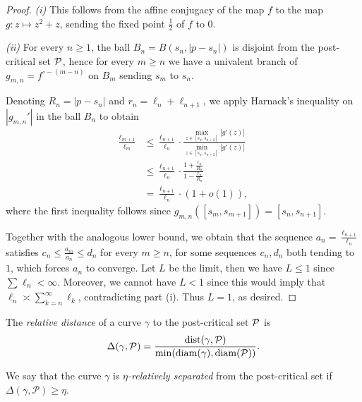\begin{proof} \leavevmode
	\emph{(i)} This follows from the affine conjugacy of the map $f$ to the map $g: z\mapsto z^2+z$, sending the fixed point $\frac 12$ of $f$ to $0$.
	
	\emph{(ii)} For every $n \geq 1$, the ball $B_n = B(s_n, |p - s_n|)$
	is disjoint from the post-critical set $\operatorname{\mathcal P}$, hence for every $m \geq n$ we have a univalent branch of $g_{m,n}=f^{\circ -(m-n)}$ on $B_m$ sending $s_m$ to $s_n$. 
	
	Denoting $R_n= |p-s_n|$ and $r_n = \ell_n+\ell_{n+1}$, we apply Harnack's inequality on $|g_{m,n}'|$ in the ball $B_n$ to obtain 
	\begin{align*}
		\frac{\ell_{m+1}}{\ell_m}  & \leq \frac{\ell_{n+1}}{\ell_n} \cdot \frac{\max_{z\in [s_n,s_{n+2}]} |g'(z)|}{\min_{z \in [s_n,s_{n+2}]} |g'(z)|}  \\ &
		 \leq \frac{\ell_{n+1}}{\ell_n} \cdot \frac{1+\frac{r_n}{R_n}}{1-\frac{r_n}{R_n}}
		 \\ &= \frac{\ell_{n+1}}{\ell_n} \cdot (1+o(1)),
	\end{align*}
	where the first inequality follows since $g_{m,n}\left([s_m,s_{m+1}]\right) = [s_n,s_{n+1}]$.
	
	Together with the analogous lower bound, we obtain that the sequence  $a_n = \frac{\ell_{n+1}}{\ell_n}$ satisfies $c_n \leq \frac {a_m}{a_n} \leq d_n$ for every $m \geq n$, for some sequences $c_n,d_n$ both tending to $1$, which forces $a_n$ to converge. Let $L$ be the limit, then we have $L \leq 1$ since $\sum_{}\ell_n < \infty$. Moreover, we cannot have $L<1$ since this would imply that $\ell_n \asymp \sum_{k=n}^\infty \ell_k$, contradicting part (i). Thus $L=1$, as desired.
\end{proof}

\begin{definition}
The \emph{relative distance} of a curve $\gamma$ to the post-critical set $\operatorname{\mathcal P}$ is 
$$\Delta (\gamma, \mathcal P) = \frac {\operatorname{dist}(\gamma, \mathcal P)}{\min (\operatorname{diam} (\gamma), \operatorname{diam} (\mathcal P))}.$$

We say that the curve $\gamma$ is \emph{$\eta$-relatively separated} from the post-critical set if $\Delta (\gamma, \mathcal P) \geq \eta$.  
\end{definition}
 
